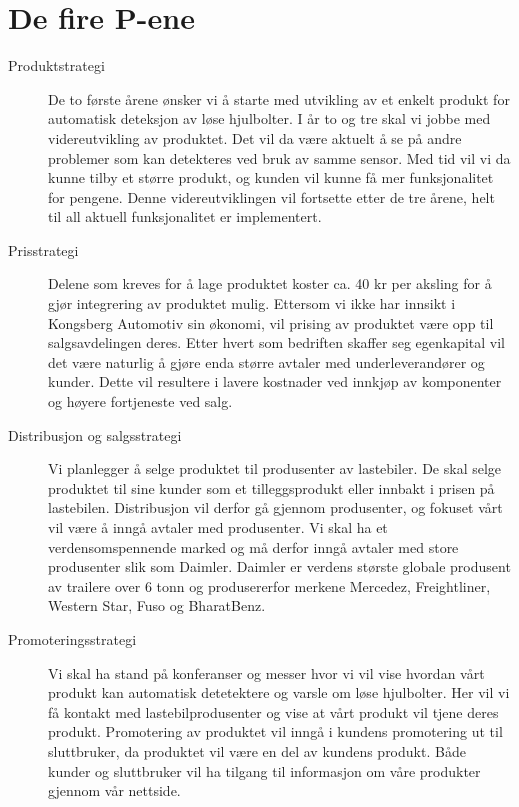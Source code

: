 \section{De fire P-ene}
\begin{description}
	\item[Produktstrategi] De to første årene ønsker vi å starte med utvikling av et enkelt produkt for 		automatisk deteksjon av løse hjulbolter. I år to og tre skal vi jobbe med videreutvikling av 				produktet. Det vil da være aktuelt å se på andre problemer som kan detekteres ved bruk av 			samme sensor. Med tid vil vi da kunne tilby et større produkt, og kunden vil kunne få mer 			funksjonalitet for pengene. Denne videreutviklingen vil fortsette etter de tre årene, helt til all aktuell 		funksjonalitet er implementert.
	\item[Prisstrategi] Delene som kreves for å lage produktet koster ca. 40 kr per aksling for å gjør integrering av produktet mulig. Ettersom vi ikke har innsikt i Kongsberg Automotiv sin økonomi, vil prising av produktet være opp til salgsavdelingen deres. Etter hvert som bedriften skaffer seg egenkapital vil det være naturlig å gjøre enda større avtaler med underleverandører og kunder. Dette vil resultere i lavere kostnader ved innkjøp av komponenter og høyere fortjeneste ved salg.
	\item[Distribusjon og salgsstrategi] Vi planlegger å selge produktet til produsenter av lastebiler. De 		skal selge produktet til sine kunder som et tilleggsprodukt eller innbakt i prisen på lastebilen. 			Distribusjon vil derfor gå gjennom produsenter, og fokuset vårt vil være å inngå avtaler med 			produsenter. Vi skal ha et verdensomspennende marked og må derfor inngå avtaler med store 		produsenter slik som Daimler\cite{daimler}. Daimler er verdens største globale produsent av 				trailere over 6 tonn og produsererfor merkene Mercedez, Freightliner, Western Star, Fuso og 			BharatBenz.
	\item[Promoteringsstrategi] Vi skal ha stand på konferanser og messer hvor vi vil vise hvordan vårt 	produkt kan automatisk detetektere og varsle om løse hjulbolter. Her vil vi få kontakt med 			lastebilprodusenter og vise at vårt produkt vil tjene deres produkt. Promotering av produktet vil 		inngå i kundens promotering ut til sluttbruker, da produktet vil være en del av kundens produkt. 		Både kunder og 	sluttbruker vil ha tilgang til informasjon om våre produkter gjennom vår nettside.
\end{description}